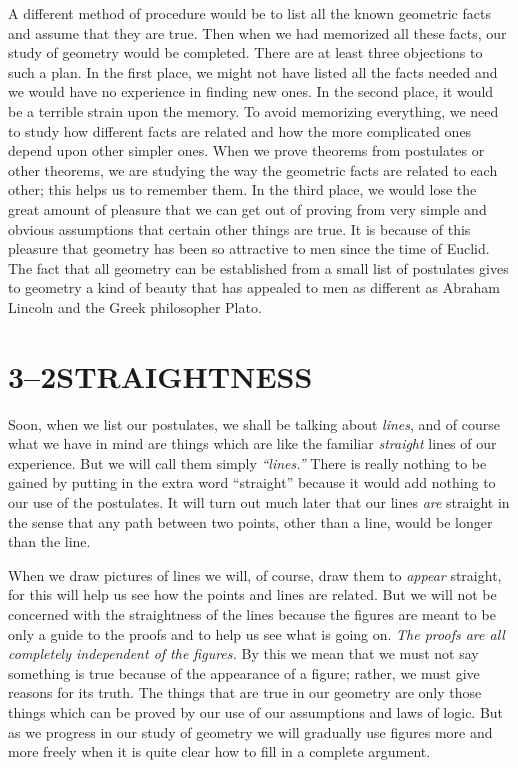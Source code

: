 \documentclass[11pt]{book}
\theoremstyle{bkplain}
\theoremstyle{XIplainnote}
\theoremstyle{bkplain}
\theoremstyle{bkplain}
\begin{document}
A different method of procedure would be to list all the known geometric facts
and assume that they are true. Then when we had memorized all these facts, our
study of geometry would be completed. There are at least three objections to
such a plan. In the first place, we might not have listed all the facts needed
and we would have no experience in finding new ones. In the second place, it
would be a terrible strain upon the memory. To avoid memorizing everything, we
need to study how different facts are related and how the more complicated ones
depend upon other simpler ones. When we prove theorems from postulates or other
theorems, we are studying the way the geometric facts are related to each other;
this helps us to remember them. In the third place, we would lose the great
amount of pleasure that we can get out of proving from very simple and obvious
assumptions that certain other things are true. It is because of this pleasure
that geometry has been so attractive to men since the time of Euclid. The fact
that all geometry can be established from a small list of postulates gives to
geometry a kind of beauty that has appealed to men as different as Abraham
Lincoln and the Greek philosopher Plato.

\section*{3--2\quad STRAIGHTNESS}

Soon, when we list our postulates, we shall be talking about \emph{lines}, and of
course what we have in mind are things which are like the familiar \emph{straight}
lines of our experience. But we will call them simply \emph{``lines.''} There is
really nothing to be gained by putting in the extra word ``straight'' because it
would add nothing to our use of the postulates. It will turn out much later that
our lines \emph{are} straight in the sense that any path between two points,
other than a line, would be longer than the line.

When we draw pictures of lines we will, of course, draw them to \emph{appear}
straight, for this will help us see how the points and lines are related. But we
will not be concerned with the straightness of the lines because the figures are
meant to be only a guide to the proofs and to help us see what is going on.
\emph{The proofs are all completely independent of the figures.} By this we mean
that we must not say something is true because of the appearance of a figure;
rather, we must give reasons for its truth. The things that are true in our
geometry are only those things which can be proved by our use of our assumptions
and laws of logic. But as we progress in our study of geometry we will gradually
use figures more and more freely when it is quite clear how to fill in a complete
argument.
\end{document}
